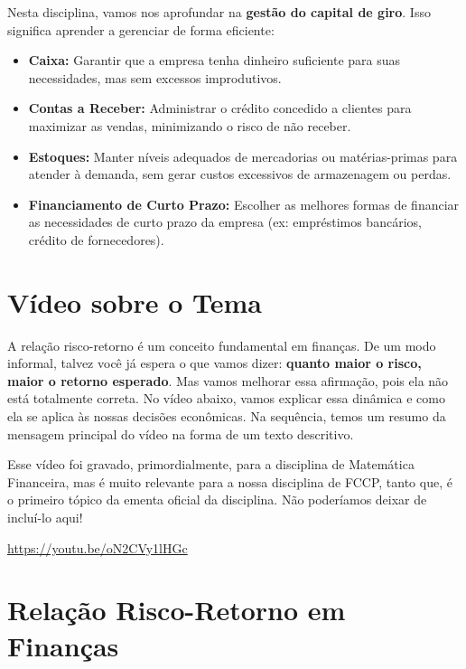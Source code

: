 \documentclass[
  a4paper,
]{book}
\begin{document}
Nesta disciplina, vamos nos aprofundar na \textbf{gestão do capital de
giro}. Isso significa aprender a gerenciar de forma eficiente:

\begin{itemize}
\item
  \textbf{Caixa:} Garantir que a empresa tenha dinheiro suficiente para
  suas necessidades, mas sem excessos improdutivos.
\item
  \textbf{Contas a Receber:} Administrar o crédito concedido a clientes
  para maximizar as vendas, minimizando o risco de não receber.
\item
  \textbf{Estoques:} Manter níveis adequados de mercadorias ou
  matérias-primas para atender à demanda, sem gerar custos excessivos de
  armazenagem ou perdas.
\item
  \textbf{Financiamento de Curto Prazo:} Escolher as melhores formas de
  financiar as necessidades de curto prazo da empresa (ex: empréstimos
  bancários, crédito de fornecedores).
\end{itemize}

\section*{\texorpdfstring{\textbf{Vídeo sobre o
Tema}}{Vídeo sobre o Tema}}\label{vuxeddeo-sobre-o-tema}


A relação risco-retorno é um conceito fundamental em finanças. De um
modo informal, talvez você já espera o que vamos dizer: \textbf{quanto
maior o risco, maior o retorno esperado}. Mas vamos melhorar essa
afirmação, pois ela não está totalmente correta. No vídeo abaixo, vamos
explicar essa dinâmica e como ela se aplica às nossas decisões
econômicas. Na sequência, temos um resumo da mensagem principal do vídeo
na forma de um texto descritivo.

Esse vídeo foi gravado, primordialmente, para a disciplina de Matemática
Financeira, mas é muito relevante para a nossa disciplina de FCCP, tanto
que, é o primeiro tópico da ementa oficial da disciplina. Não poderíamos
deixar de incluí-lo aqui!

\url{https://youtu.be/oN2CVy1lHGc}

\section{Relação Risco-Retorno em
Finanças}\label{relauxe7uxe3o-risco-retorno-em-finanuxe7as}
\end{document}
